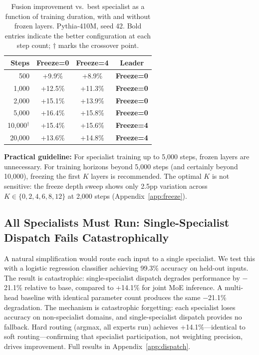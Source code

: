 \documentclass{article}
\begin{document}
\begin{table}[h]
\centering
\caption{Fusion improvement vs.\ best specialist as a function of training duration, with and without frozen layers. Pythia-410M, seed 42. Bold entries indicate the better configuration at each step count; $\dagger$ marks the crossover point.}
\label{tab:crossover}
\begin{tabular}{rccc}
\toprule
\textbf{Steps} & \textbf{Freeze=0} & \textbf{Freeze=4} & \textbf{Leader} \\
\midrule
500   & +9.9\%  & +8.9\%  & \textbf{Freeze=0} \\
1,000 & +12.5\% & +11.3\% & \textbf{Freeze=0} \\
2,000 & +15.1\% & +13.9\% & \textbf{Freeze=0} \\
5,000 & +16.4\% & +15.8\% & \textbf{Freeze=0} \\
10,000$^\dagger$ & +15.4\% & +15.6\% & \textbf{Freeze=4} \\
20,000 & +13.6\% & +14.8\% & \textbf{Freeze=4} \\
\bottomrule
\end{tabular}
\end{table}

\textbf{Practical guideline:} For specialist training up to 5,000 steps, frozen layers are unnecessary. For training horizons beyond 5,000 steps (and certainly beyond 10,000), freezing the first $K$ layers is recommended. The optimal $K$ is not sensitive: the freeze depth sweep shows only 2.5pp variation across $K \in \{0, 2, 4, 6, 8, 12\}$ at 2,000 steps (Appendix~\ref{app:freeze}).

\subsection{All Specialists Must Run: Single-Specialist Dispatch Fails Catastrophically}
\label{sec:failure}

A natural simplification would route each input to a single specialist. We test this with a logistic regression classifier achieving 99.3\% accuracy on held-out inputs. The result is catastrophic: single-specialist dispatch degrades performance by $-$21.1\% relative to base, compared to +14.1\% for joint MoE inference. A multi-head baseline with identical parameter count produces the same $-$21.1\% degradation. The mechanism is catastrophic forgetting: each specialist loses accuracy on non-specialist domains, and single-specialist dispatch provides no fallback. Hard routing (argmax, all experts run) achieves +14.1\%---identical to soft routing---confirming that specialist participation, not weighting precision, drives improvement. Full results in Appendix~\ref{app:dispatch}.
\end{document}
